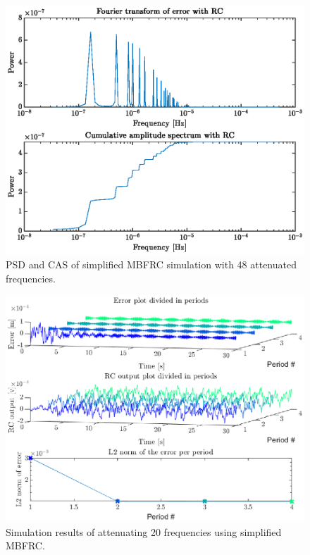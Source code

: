 \documentclass[journal]{IEEEtran}
\begin{document}
\begin{figure}
    \centering
    \includegraphics[width=1\linewidth]{figures/simple_MBFRC/FourierSimp48.eps}
    \caption{PSD and CAS of simplified MBFRC simulation with 48 attenuated frequencies.}
    \label{fig:fftSimp48}
\end{figure}
\begin{figure}
    \centering
    \includegraphics[width=1\linewidth]{figures/simple_MBFRC/SimulationSimp20.eps}
    \caption{Simulation results of attenuating 20 frequencies using simplified MBFRC.}
    \label{fig:SimSimp20}
\end{figure}
\end{document}

